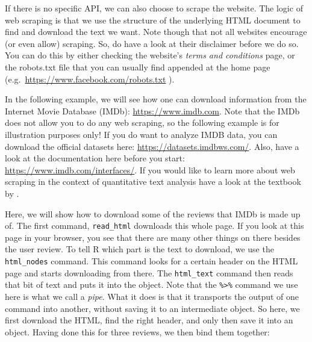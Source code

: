 \documentclass[
]{article}
\begin{document}
If there is no specific API, we can also choose to scrape the website. The logic of web scraping is that we use the structure of the underlying HTML document to find and download the text we want. Note though that not all websites encourage (or even allow) scraping. So, do have a look at their disclaimer before we do so. You can do this by either checking the website's \emph{terms and conditions} page, or the robots.txt file that you can usually find appended at the home page (e.g.~\url{https://www.facebook.com/robots.txt} ).

In the following example, we will see how one can download information from the Internet Movie Database (IMDb): \url{https://www.imdb.com}. Note that the IMDb does not allow you to do any web scraping, so the following example is for illustration purposes only! If you do want to analyze IMDB data, you can download the official datasets here: \url{https://datasets.imdbws.com/}. Also, have a look at the documentation here before you start: \url{https://www.imdb.com/interfaces/}. If you would like to learn more about web scraping in the context of quantitative text analysis have a look at the textbook by \textcite{Munzert2014a}.

Here, we will show how to download some of the reviews that IMDb is made up of. The first command, \texttt{read\_html} downloads this whole page. If you look at this page in your browser, you see that there are many other things on there besides the user review. To tell R which part is the text to download, we use the \texttt{html\_nodes} command. This command looks for a certain header on the HTML page and starts downloading from there. The \texttt{html\_text} command then reads that bit of text and puts it into the object. Note that the \texttt{\%\textgreater{}\%} command we use here is what we call a \emph{pipe}. What it does is that it transports the output of one command into another, without saving it to an intermediate object. So here, we first download the HTML, find the right header, and only then save it into an object. Having done this for three reviews, we then bind them together:
\end{document}
